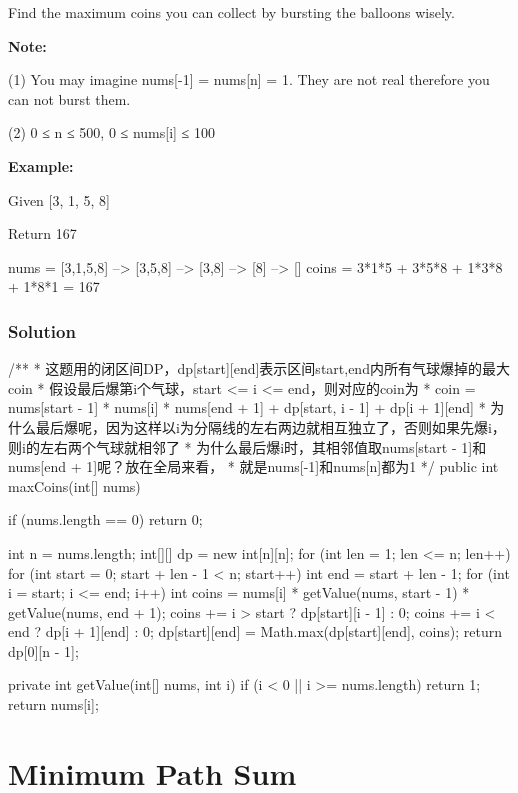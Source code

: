 Find the maximum coins you can collect by bursting the balloons wisely.

\textbf{Note:}

(1) You may imagine nums[-1] = nums[n] = 1. They are not real therefore you can not burst them.

(2) 0 ≤ n ≤ 500, 0 ≤ nums[i] ≤ 100

\textbf{Example:}

Given [3, 1, 5, 8]

Return 167
\begin{Code}
    nums = [3,1,5,8] --> [3,5,8] -->   [3,8]   -->  [8]  --> []
   coins =  3*1*5      +  3*5*8    +  1*3*8      + 1*8*1   = 167
\end{Code}
\subsubsection{Solution}

\begin{Code}
/**
 * 这题用的闭区间DP，dp[start][end]表示区间start,end内所有气球爆掉的最大coin
 * 假设最后爆第i个气球，start <= i <= end，则对应的coin为
 * coin = nums[start - 1] * nums[i] * nums[end + 1] + dp[start, i - 1] + dp[i + 1][end]
 * 为什么最后爆呢，因为这样以i为分隔线的左右两边就相互独立了，否则如果先爆i，则i的左右两个气球就相邻了
 * 为什么最后爆i时，其相邻值取nums[start - 1]和nums[end + 1]呢？放在全局来看，
 * 就是nums[-1]和nums[n]都为1
 */
public int maxCoins(int[] nums) {
    if (nums.length == 0) {return 0;}

    int n = nums.length;
    int[][] dp = new int[n][n];
    for (int len = 1; len <= n; len++) {
        for (int start = 0; start + len - 1 < n; start++) {
            int end = start + len - 1;
            for (int i = start; i <= end; i++) {
                int coins = nums[i] * getValue(nums, start - 1) * getValue(nums, end + 1);
                coins += i > start ? dp[start][i - 1] : 0;
                coins += i < end ? dp[i + 1][end] : 0;
                dp[start][end] = Math.max(dp[start][end], coins);
            }
        }
    }
    return dp[0][n - 1];
}

private int getValue(int[] nums, int i) {
    if (i < 0 || i >= nums.length) {
        return 1;
    }
    return nums[i];
}
\end{Code}

\newpage

\section{Minimum Path Sum} %

